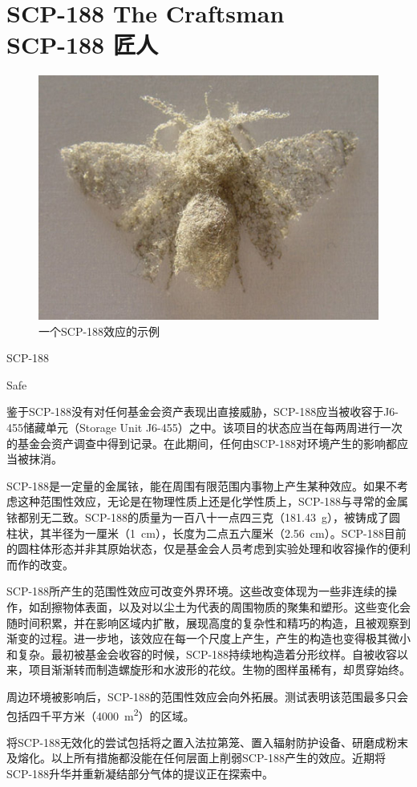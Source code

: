 \chapter[SCP-188 匠人]{
    SCP-188 The Craftsman\\
    SCP-188 匠人
}

\label{chap:SCP-188}

\begin{figure}[H]
    \centering
    \includegraphics[width=0.5\linewidth]{images/SCP-188.jpg}
    \caption*{一个SCP-188效应的示例}
\end{figure}

SCP-188

Safe

鉴于SCP-188没有对任何基金会资产表现出直接威胁，SCP-188应当被收容于J6-455储藏单元（Storage Unit J6-455）之中。该项目的状态应当在每两周进行一次的基金会资产调查中得到记录。在此期间，任何由SCP-188对环境产生的影响都应当被抹消。

SCP-188是一定量的金属铱，能在周围有限范围内事物上产生某种效应。如果不考虑这种范围性效应，无论是在物理性质上还是化学性质上，SCP-188与寻常的金属铱都别无二致。SCP-188的质量为一百八十一点四三克（181.43 g），被铸成了圆柱状，其半径为一厘米（1 cm），长度为二点五六厘米（2.56 cm）。SCP-188目前的圆柱体形态并非其原始状态，仅是基金会人员考虑到实验处理和收容操作的便利而作的改变。

SCP-188所产生的范围性效应可改变外界环境。这些改变体现为一些非连续的操作，如刮擦物体表面，以及对以尘土为代表的周围物质的聚集和塑形。这些变化会随时间积累，并在影响区域内扩散，展现高度的复杂性和精巧的构造，且被观察到渐变的过程。进一步地，该效应在每一个尺度上产生，产生的构造也变得极其微小和复杂。最初被基金会收容的时候，SCP-188持续地构造着分形纹样。自被收容以来，项目渐渐转而制造螺旋形和水波形的花纹。生物的图样虽稀有，却贯穿始终。

周边环境被影响后，SCP-188的范围性效应会向外拓展。测试表明该范围最多只会包括四千平方米（4000 m\textsuperscript{2}）的区域。

将SCP-188无效化的尝试包括将之置入法拉第笼、置入辐射防护设备、研磨成粉末及熔化。以上所有措施都没能在任何层面上削弱SCP-188产生的效应。近期将SCP-188升华并重新凝结部分气体的提议正在探索中。

